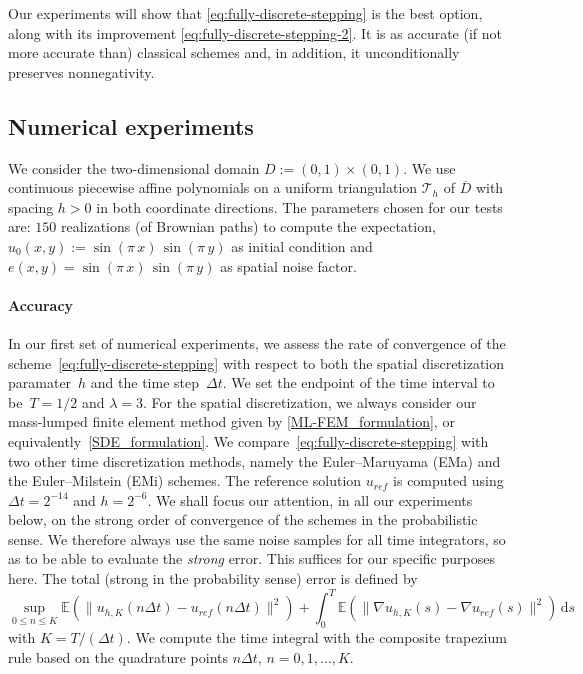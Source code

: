 \documentclass[12pt]{article}
\newcommand{\dd}{\,\mathrm{d}}
\begin{document}
{Our experiments will show that \eqref{eq:fully-discrete-stepping} is the best option, along with its improvement \eqref{eq:fully-discrete-stepping-2}. It is as accurate (if not more accurate than) classical schemes and, in addition, it unconditionally preserves nonnegativity. 



 



\subsection{Numerical experiments}

We consider the two-dimensional domain $D :=(0,1) \times (0,1)$. We use continuous piecewise 
affine polynomials on a uniform triangulation $\mathcal{T}_h$ of $\overline{D}$ with spacing $h>0$ in both coordinate directions.
The parameters chosen for our tests are:
$150$ realizations (of Brownian paths) to compute the expectation,
$u_0(x,y) := \sin(\pi\,x)\,\sin(\pi\,y)$ as initial condition and  $e(x,y) = \sin(\pi\,x)\,\sin(\pi\,y)$ as spatial noise factor.  

\paragraph*{Accuracy}

In our first set of numerical experiments, we assess the rate of convergence of the scheme~\eqref{eq:fully-discrete-stepping} with respect to both the spatial discretization paramater~$h$ and the time step~$\Delta t$. We set the endpoint of the time interval to be~$T = 1/2$ and $\lambda=3$. For the spatial discretization, we always consider our mass-lumped finite element method given by \eqref{ML-FEM_formulation}, or equivalently~\eqref{SDE_formulation}. We compare~\eqref{eq:fully-discrete-stepping} with two other time discretization methods, namely the Euler--Maruyama (EMa) and the Euler--Milstein (EMi) schemes. 
The reference solution $u_{ref}$ is computed using $\Delta t=2^{-14}$ and $h = 2^{-6}$. We shall focus our attention, in all our experiments below, on the strong order of convergence of the schemes in the probabilistic sense. We therefore always use the same noise samples for all time integrators, so as to be able to evaluate the \emph{strong} error. This suffices for our specific purposes here. The total (strong in the probability sense) error is defined by
\begin{equation}
\label{eq:definition-error}
    \sup_{0\leq n \leq K} \mathbb{E}(\| u_{h,K}(n\Delta t) - u_{ref}(n \Delta t)\|^2) +
    \int_0^T \mathbb{E} (\| \nabla u_{h,K}(s) - \nabla u_{ref}(s)\|^2) \dd s
\end{equation}
with $K=T/(\Delta t)$.  
We compute the time integral with the composite trapezium rule based on the quadrature points $n \Delta t$, $n=0,1,\ldots,K$. 

}
\end{document}

